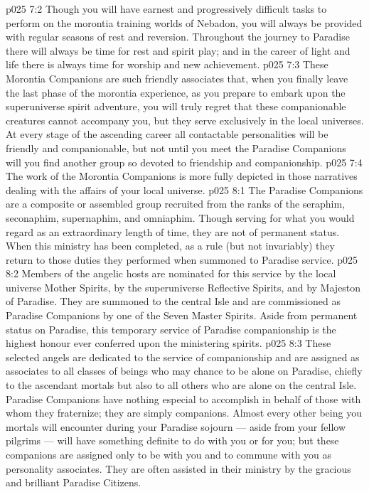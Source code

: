 \vs p025 7:2 Though you will have earnest and progressively difficult tasks to perform on the morontia training worlds of Nebadon, you will always be provided with regular seasons of rest and reversion. Throughout the journey to Paradise there will always be time for rest and spirit play; and in the career of light and life there is always time for worship and new achievement.
\vs p025 7:3 These Morontia Companions are such friendly associates that, when you finally leave the last phase of the morontia experience, as you prepare to embark upon the superuniverse spirit adventure, you will truly regret that these companionable creatures cannot accompany you, but they serve exclusively in the local universes. At every stage of the ascending career all contactable personalities will be friendly and companionable, but not until you meet the Paradise Companions will you find another group so devoted to friendship and companionship.
\vs p025 7:4 The work of the Morontia Companions is more fully depicted in those narratives dealing with the affairs of your local universe.
\vs p025 8:1 The Paradise Companions are a composite or assembled group recruited from the ranks of the seraphim, seconaphim, supernaphim, and omniaphim. Though serving for what you would regard as an extraordinary length of time, they are not of permanent status. When this ministry has been completed, as a rule (but not invariably) they return to those duties they performed when summoned to Paradise service.
\vs p025 8:2 Members of the angelic hosts are nominated for this service by the local universe Mother Spirits, by the superuniverse Reflective Spirits, and by Majeston of Paradise. They are summoned to the central Isle and are commissioned as Paradise Companions by one of the Seven Master Spirits. Aside from permanent status on Paradise, this temporary service of Paradise companionship is the highest honour ever conferred upon the ministering spirits.
\vs p025 8:3 These selected angels are dedicated to the service of companionship and are assigned as associates to all classes of beings who may chance to be alone on Paradise, chiefly to the ascendant mortals but also to all others who are alone on the central Isle. Paradise Companions have nothing especial to accomplish in behalf of those with whom they fraternize; they are simply companions. Almost every other being you mortals will encounter during your Paradise sojourn --- aside from your fellow pilgrims --- will have something definite to do with you or for you; but these companions are assigned only to be with you and to commune with you as personality associates. They are often assisted in their ministry by the gracious and brilliant Paradise Citizens.
